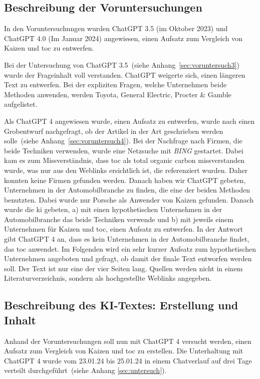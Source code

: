 
\subsection{Beschreibung der Voruntersuchungen}

In den Voruntersuchungen wurden ChatGPT 3.5 (im Oktober 2023) und ChatGPT 4.0 (Im Januar 2024) angewiesen,
einen Aufsatz zum Vergleich von Kaizen und \gls{toc} zu entwerfen.

Bei der Untersuchung von ChatGPT 3.5~(siehe Anhang~\ref{sec:voruntersuch3}) wurde der Frageinhalt voll verstanden. ChatGPT weigerte sich, einen längeren Text zu entwerfen.
Bei der expliziten Fragen, welche Unternehmen beide Methoden anwenden, werden Toyota, General Electric, Procter \& Gamble aufgelistet.

Als ChatGPT 4 angewiesen wurde, einen Aufsatz zu entwerfen, wurde nach einen Grobentwurf nachgefragt, ob der Artikel in der Art geschrieben werden solle~(siehe Anhang~\ref{sec:voruntersuch4}). Bei der Nachfrage nach Firmen, die beide Techniken verwenden, wurde eine Netzsuche mit \textit{BING} gestartet. Dabei kam es zum Missverständnis, dass \gls{toc} als total organic carbon missverstanden wurde, was nur aus den Weblinks ersichtlich ist, die referenziert wurden. Daher konnten keine Firmen gefunden werden. Danach haben wir ChatGPT gebeten, Unternehmen in der Automobilbranche zu finden, die eine der beiden Methoden benutzten. Dabei wurde nur Porsche als Anwender von Kaizen gefunden. Danach wurde die \gls{ki} gebeten, a) mit einen hypothetischen Unternehmen in der Automobilbranche das beide Techniken verwende und  b) mit jeweils einem Unternehmen für Kaizen und \gls{toc}, einen Aufsatz zu entwerfen. In der Antwort gibt ChatGPT 4 an, dass es kein Unternehmen in der Automobilbranche findet, das \gls{toc} anwendet. Im Folgenden wird ein sehr kurzer Aufsatz zum hypothetischen Unternehmen angeboten und gefragt, ob damit der finale Text entworfen werden soll. Der Text ist nur eine der vier Seiten lang. Quellen werden nicht in einem Literaturverzeichnis, sondern als hochgestellte Weblinks angegeben.

\subsection{Beschreibung des KI-Textes: Erstellung und Inhalt}

Anhand der Voruntersuchungen soll nun mit ChatGPT 4 versucht werden, einen Aufsatz zum Vergleich von Kaizen und \gls{toc} zu erstellen. Die Unterhaltung mit ChatGPT 4 wurde vom 23.01.24 bis 25.01.24 in einem Chatverlauf auf drei Tage verteilt durchgeführt~(siehe Anhang \ref{sec:untersuch}).

